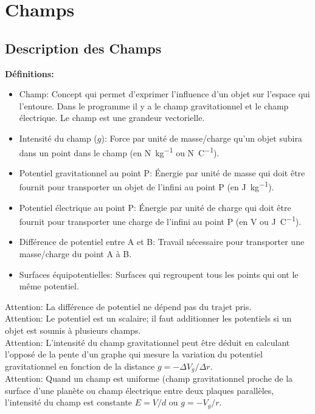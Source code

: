 \documentclass[french, a4paper, 12pt]{article}
\begin{document}
\section{Champs}
\subsection{Description des Champs}
\textbf{Définitions:}
\begin{itemize}
\item Champ: Concept qui permet d'exprimer l'influence d'un objet sur l'espace qui l'entoure. Dans le programme il y a le champ gravitationnel et le champ électrique. Le champ est une grandeur vectorielle.
\item Intensité du champ ($g$): Force par unité de masse/charge qu'un objet subira dans un point dans le champ (en \si{N.kg^{-1}} ou \si{N.C^{-1}}).
\item Potentiel gravitationnel au point P: Énergie par unité de masse qui doit être fournit pour transporter un objet de l'infini au point P (en \si{J.kg^{-1}}).
\item Potentiel électrique au point P: Énergie par unité de charge qui doit être fournit pour transporter une charge de l'infini au point P (en \si{V} ou \si{J.C^{-1}}).
\item Différence de potentiel entre A et B: Travail nécessaire pour transporter une masse/charge du point A à B.
\item Surfaces équipotentielles: Surfaces qui regroupent tous les points qui ont le même potentiel.
\end{itemize}
Attention: La différence de potentiel ne dépend pas du trajet pris.\\
Attention: Le potentiel est un scalaire; il faut additionner les potentiels si un objet est soumis à plusieurs champs.\\
Attention: L'intensité du champ gravitationnel peut être déduit en calculant l'opposé de la pente d'un graphe qui mesure la variation du potentiel gravitationnel en fonction de la distance $g=-\Delta V_g/\Delta r$.\\
Attention: Quand un champ est uniforme (champ gravitationnel proche de la surface d'une planète ou champ électrique entre deux plaques parallèles, l'intensité du champ est constante $E=V/d$ ou $g=-V_g/r$.
\end{document}
